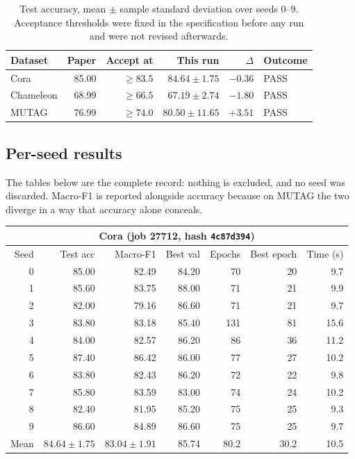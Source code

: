 \documentclass[11pt,a4paper]{article}
\begin{document}
\begin{table}[!htbp]
\centering
\begin{tabular}{lrrrrl}
\toprule
Dataset & Paper & Accept at & This run & $\Delta$ & Outcome \\
\midrule
Cora      & 85.00 & $\geq 83.5$ & $84.64 \pm 1.75$  & $-0.36$ & PASS \\
Chameleon & 68.99 & $\geq 66.5$ & $67.19 \pm 2.74$  & $-1.80$ & PASS \\
MUTAG     & 76.99 & $\geq 74.0$ & $80.50 \pm 11.65$ & $+3.51$ & PASS \\
\bottomrule
\end{tabular}
\caption{Test accuracy, mean $\pm$ sample standard deviation over seeds 0--9. Acceptance
thresholds were fixed in the specification before any run and were not revised afterwards.}
\end{table}

\subsection{Per-seed results}

The tables below are the complete record: nothing is excluded, and no seed was discarded. Macro-F1
is reported alongside accuracy because on MUTAG the two diverge in a way that accuracy alone
conceals.

\begin{table}[!htbp]
\centering
\begin{tabular}{rrrrrrr}
\toprule
\multicolumn{7}{c}{\textbf{Cora} (job 27712, hash \texttt{4c87d394})} \\
\midrule
Seed & Test acc & Macro-F1 & Best val & Epochs & Best epoch & Time (s) \\
\midrule
0 & 85.00 & 82.49 & 84.20 & 70 & 20 & 9.7 \\
1 & 85.60 & 83.75 & 88.00 & 71 & 21 & 9.9 \\
2 & 82.00 & 79.16 & 86.60 & 71 & 21 & 9.7 \\
3 & 83.80 & 83.18 & 85.40 & 131 & 81 & 15.6 \\
4 & 84.00 & 82.57 & 86.20 & 86 & 36 & 11.2 \\
5 & 87.40 & 86.42 & 86.00 & 77 & 27 & 10.2 \\
6 & 83.80 & 82.43 & 86.20 & 72 & 22 & 9.8 \\
7 & 85.80 & 83.59 & 83.00 & 74 & 24 & 10.2 \\
8 & 82.40 & 81.95 & 85.20 & 75 & 25 & 9.3 \\
9 & 86.60 & 84.89 & 86.60 & 75 & 25 & 9.7 \\
\midrule
Mean & $84.64 \pm 1.75$ & $83.04 \pm 1.91$ & 85.74 & 80.2 & 30.2 & 10.5 \\
\bottomrule
\end{tabular}
\end{table}
\end{document}
